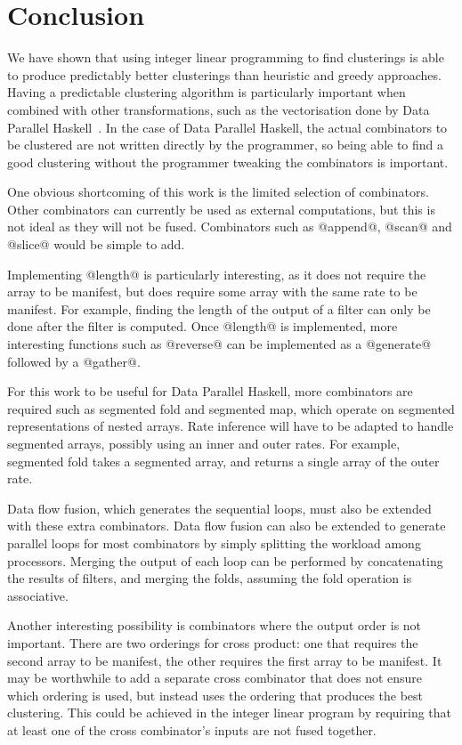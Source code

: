 \section{Conclusion}

We have shown that using integer linear programming to find clusterings is able to produce predictably better clusterings than heuristic and greedy approaches.
Having a predictable clustering algorithm is particularly important when combined with other transformations, such as the vectorisation done by Data Parallel Haskell~\cite{chakravarty2007data}.
In the case of Data Parallel Haskell, the actual combinators to be clustered are not written directly by the programmer, so being able to find a good clustering without the programmer tweaking the combinators is important.

One obvious shortcoming of this work is the limited selection of combinators.
Other combinators can currently be used as external computations, but this is not ideal as they will not be fused.
Combinators such as @append@, @scan@ and @slice@ would be simple to add.

Implementing @length@ is particularly interesting, as it does not require the array to be manifest, but does require some array with the same rate to be manifest.
For example, finding the length of the output of a filter can only be done after the filter is computed.
Once @length@ is implemented, more interesting functions such as @reverse@ can be implemented as a @generate@ followed by a @gather@.

For this work to be useful for Data Parallel Haskell, more combinators are required such as segmented fold and segmented map, which operate on segmented representations of nested arrays.
Rate inference will have to be adapted to handle segmented arrays, possibly using an inner and outer rates.
For example, segmented fold takes a segmented array, and returns a single array of the outer rate.

Data flow fusion, which generates the sequential loops, must also be extended with these extra combinators.
Data flow fusion can also be extended to generate parallel loops for most combinators by simply splitting the workload among processors.
Merging the output of each loop can be performed by concatenating the results of filters, and merging the folds, assuming the fold operation is associative.

Another interesting possibility is combinators where the output order is not important.
There are two orderings for cross product: one that requires the second array to be manifest, the other requires the first array to be manifest.
It may be worthwhile to add a separate cross combinator that does not ensure which ordering is used, but instead uses the ordering that produces the best clustering.
This could be achieved in the integer linear program by requiring that at least one of the cross combinator's inputs are not fused together.

